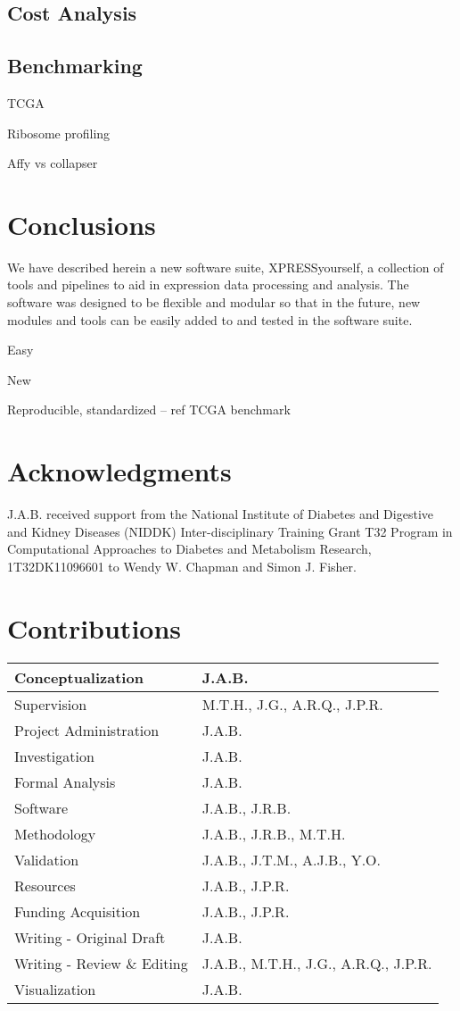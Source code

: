 \documentclass[11pt, a4paper, oneside]{article}
\begin{document}
\subsection{Cost Analysis}

\subsection{Benchmarking}

TCGA

Ribosome profiling

Affy vs collapser

\section{Conclusions}
We have described herein a new software suite, XPRESSyourself, a collection of tools and pipelines to aid in expression data processing and analysis. The software was designed to be flexible and modular so that in the future, new modules and tools can be easily added to and tested in the software suite.


Easy

New

Reproducible, standardized -- ref TCGA benchmark


\section*{Acknowledgments}
J.A.B. received support from the National Institute of Diabetes and Digestive and Kidney Diseases (NIDDK) Inter-disciplinary Training Grant T32 Program in Computational Approaches to Diabetes and Metabolism Research, 1T32DK11096601 to Wendy W. Chapman and Simon J. Fisher.


\section*{Contributions}
\begin{tabular}{ l l }
 Conceptualization & J.A.B. \\
 \hline
 Supervision & M.T.H., J.G., A.R.Q., J.P.R. \\
 \hline
 Project Administration & J.A.B. \\
 \hline
 Investigation & J.A.B. \\
 \hline
 Formal Analysis & J.A.B. \\
 \hline
 Software & J.A.B., J.R.B. \\
 \hline
 Methodology & J.A.B., J.R.B., M.T.H. \\
 \hline
 Validation & J.A.B., J.T.M., A.J.B., Y.O. \\
 \hline
 Resources & J.A.B., J.P.R. \\
 \hline
 Funding Acquisition & J.A.B., J.P.R. \\
 \hline
 Writing - Original Draft & J.A.B. \\
 \hline
 Writing - Review \& Editing & J.A.B., M.T.H., J.G., A.R.Q., J.P.R. \\
 \hline
 Visualization & J.A.B.
\end{tabular}





\end{document}
